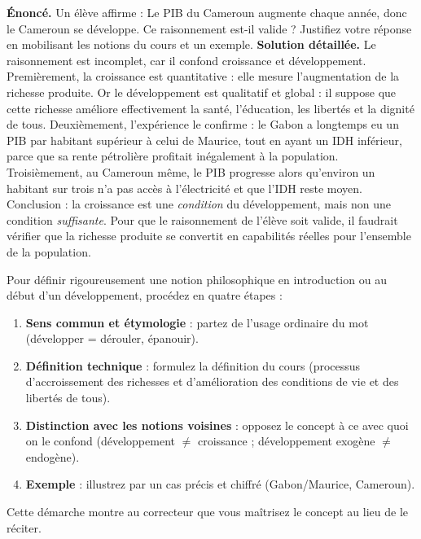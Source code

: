 \documentclass[11pt]{article}
\newcommand{\cle}[1]{{\popxbold\color{popdark}#1}}
\begin{document}
\begin{exoresolu}
\textbf{Énoncé.} Un élève affirme : \og Le PIB du Cameroun augmente chaque année, donc le Cameroun se développe. \fg{} Ce raisonnement est-il valide ? Justifiez votre réponse en mobilisant les notions du cours et un exemple.
\tcblower
\textbf{Solution détaillée.} Le raisonnement est incomplet, car il confond \cle{croissance} et \cle{développement}. Premièrement, la croissance est quantitative : elle mesure l'augmentation de la richesse produite. Or le développement est qualitatif et global : il suppose que cette richesse améliore effectivement la santé, l'éducation, les libertés et la dignité de tous. Deuxièmement, l'expérience le confirme : le Gabon a longtemps eu un PIB par habitant supérieur à celui de Maurice, tout en ayant un IDH inférieur, parce que sa rente pétrolière profitait inégalement à la population. Troisièmement, au Cameroun même, le PIB progresse alors qu'environ un habitant sur trois n'a pas accès à l'électricité et que l'IDH reste moyen. Conclusion : la croissance est une \emph{condition} du développement, mais non une condition \emph{suffisante}. Pour que le raisonnement de l'élève soit valide, il faudrait vérifier que la richesse produite se convertit en capabilités réelles pour l'ensemble de la population.
\end{exoresolu}

\begin{methode}
Pour définir rigoureusement une notion philosophique en introduction ou au début d'un développement, procédez en quatre étapes :
\begin{enumerate}
\item \textbf{Sens commun et étymologie} : partez de l'usage ordinaire du mot (développer = dérouler, épanouir).
\item \textbf{Définition technique} : formulez la définition du cours (processus d'accroissement des richesses et d'amélioration des conditions de vie et des libertés de tous).
\item \textbf{Distinction avec les notions voisines} : opposez le concept à ce avec quoi on le confond (développement $\neq$ croissance ; développement exogène $\neq$ endogène).
\item \textbf{Exemple} : illustrez par un cas précis et chiffré (Gabon/Maurice, Cameroun).
\end{enumerate}
Cette démarche montre au correcteur que vous maîtrisez le concept au lieu de le réciter.
\end{methode}
\end{document}
